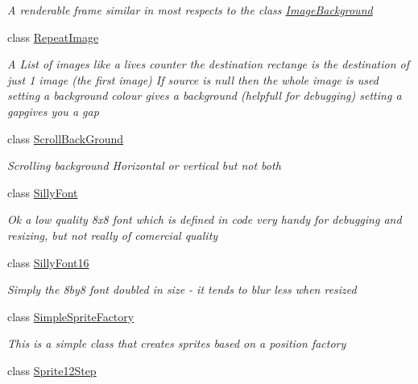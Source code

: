 \begin{DoxyCompactItemize}
\begin{DoxyCompactList}\small\item\em A renderable frame similar in most respects to the class \mbox{\hyperlink{class_r_c___framework_1_1_image_background}{Image\+Background}} \end{DoxyCompactList}\item 
class \mbox{\hyperlink{class_r_c___framework_1_1_repeat_image}{Repeat\+Image}}
\begin{DoxyCompactList}\small\item\em A List of images like a lives counter the destination rectange is the destination of just 1 image (the first image) If source is null then the whole image is used setting a background colour gives a background (helpfull for debugging) setting a gapgives you a gap \end{DoxyCompactList}\item 
class \mbox{\hyperlink{class_r_c___framework_1_1_scroll_back_ground}{Scroll\+Back\+Ground}}
\begin{DoxyCompactList}\small\item\em Scrolling background Horizontal or vertical but not both \end{DoxyCompactList}\item 
class \mbox{\hyperlink{class_r_c___framework_1_1_silly_font}{Silly\+Font}}
\begin{DoxyCompactList}\small\item\em Ok a low quality 8x8 font which is defined in code very handy for debugging and resizing, but not really of comercial quality \end{DoxyCompactList}\item 
class \mbox{\hyperlink{class_r_c___framework_1_1_silly_font16}{Silly\+Font16}}
\begin{DoxyCompactList}\small\item\em Simply the 8by8 font doubled in size -\/ it tends to blur less when resized \end{DoxyCompactList}\item 
class \mbox{\hyperlink{class_r_c___framework_1_1_simple_sprite_factory}{Simple\+Sprite\+Factory}}
\begin{DoxyCompactList}\small\item\em This is a simple class that creates sprites based on a position factory \end{DoxyCompactList}\item 
class \mbox{\hyperlink{class_r_c___framework_1_1_sprite12_step}{Sprite12\+Step}}
\item 

\end{DoxyCompactItemize}
